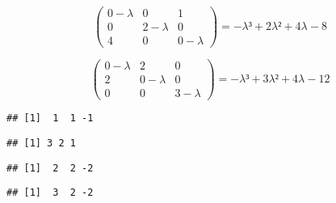 \documentclass[]{article}
\newenvironment{Shaded}{\begin{snugshade}}{\end{snugshade}}
\newcommand{\CommentTok}[1]{\textcolor[rgb]{0.56,0.35,0.01}{\textit{#1}}}
\newcommand{\KeywordTok}[1]{\textcolor[rgb]{0.13,0.29,0.53}{\textbf{#1}}}
\newcommand{\NormalTok}[1]{#1}
\newcommand{\OperatorTok}[1]{\textcolor[rgb]{0.81,0.36,0.00}{\textbf{#1}}}
\begin{document}
\[
\begin{pmatrix}
0-\lambda & 0 & 1 \\
0 & 2-\lambda & 0 \\
4 & 0 & 0-\lambda 
\end{pmatrix} = - \lambda³ + 2\lambda² + 4\lambda -8
\]

\[
\begin{pmatrix}
0-\lambda & 2 & 0 \\
2 & 0-\lambda & 0 \\
0 & 0 & 3-\lambda 
\end{pmatrix} = -\lambda³ + 3\lambda² + 4\lambda - 12
\]

\begin{Shaded}
\end{Shaded}

\begin{verbatim}
## [1]  1  1 -1
\end{verbatim}

\begin{Shaded}
\end{Shaded}

\begin{verbatim}
## [1] 3 2 1
\end{verbatim}

\begin{Shaded}
\end{Shaded}

\begin{verbatim}
## [1]  2  2 -2
\end{verbatim}

\begin{Shaded}
\end{Shaded}

\begin{verbatim}
## [1]  3  2 -2
\end{verbatim}
\end{document}
